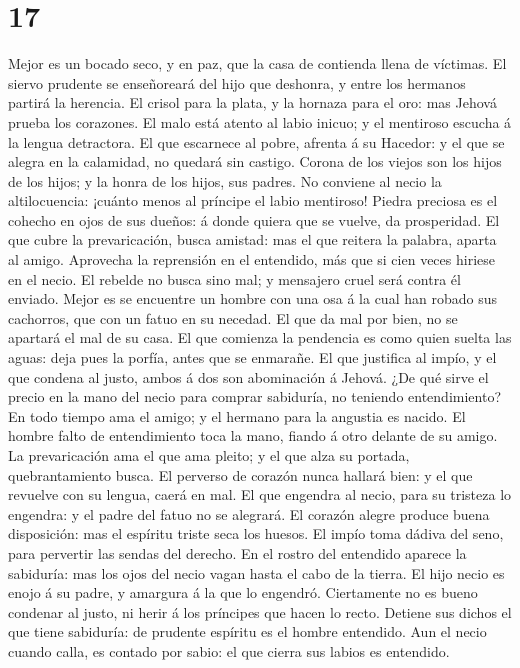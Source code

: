 \hypertarget{section-20-17}{%
\section{17}\label{section-20-17}}

 Mejor es un bocado seco, y en paz, que la casa de
contienda llena de víctimas.  El siervo prudente se
enseñoreará del hijo que deshonra, y entre los hermanos partirá la
herencia.  El crisol para la plata, y la hornaza para el
oro: mas Jehová prueba los corazones.  El malo está atento
al labio inicuo; y el mentiroso escucha á la lengua detractora.
 El que escarnece al pobre, afrenta á su Hacedor: y el que
se alegra en la calamidad, no quedará sin castigo.  Corona
de los viejos son los hijos de los hijos; y la honra de los hijos, sus
padres.  No conviene al necio la altilocuencia: ¡cuánto
menos al príncipe el labio mentiroso!  Piedra preciosa es
el cohecho en ojos de sus dueños: á donde quiera que se vuelve, da
prosperidad.  El que cubre la prevaricación, busca
amistad: mas el que reitera la palabra, aparta al amigo. 
Aprovecha la reprensión en el entendido, más que si cien veces hiriese
en el necio.  El rebelde no busca sino mal; y mensajero
cruel será contra él enviado.  Mejor es se encuentre un
hombre con una osa á la cual han robado sus cachorros, que con un fatuo
en su necedad.  El que da mal por bien, no se apartará el
mal de su casa.  El que comienza la pendencia es como
quien suelta las aguas: deja pues la porfía, antes que se enmarañe.
 El que justifica al impío, y el que condena al justo,
ambos á dos son abominación á Jehová.  ¿De qué sirve el
precio en la mano del necio para comprar sabiduría, no teniendo
entendimiento?  En todo tiempo ama el amigo; y el hermano
para la angustia es nacido.  El hombre falto de
entendimiento toca la mano, fiando á otro delante de su amigo.
 La prevaricación ama el que ama pleito; y el que alza su
portada, quebrantamiento busca.  El perverso de corazón
nunca hallará bien: y el que revuelve con su lengua, caerá en mal.
 El que engendra al necio, para su tristeza lo engendra:
y el padre del fatuo no se alegrará.  El corazón alegre
produce buena disposición: mas el espíritu triste seca los huesos.
 El impío toma dádiva del seno, para pervertir las sendas
del derecho.  En el rostro del entendido aparece la
sabiduría: mas los ojos del necio vagan hasta el cabo de la tierra.
 El hijo necio es enojo á su padre, y amargura á la que
lo engendró.  Ciertamente no es bueno condenar al justo,
ni herir á los príncipes que hacen lo recto.  Detiene sus
dichos el que tiene sabiduría: de prudente espíritu es el hombre
entendido.  Aun el necio cuando calla, es contado por
sabio: el que cierra sus labios es entendido.

